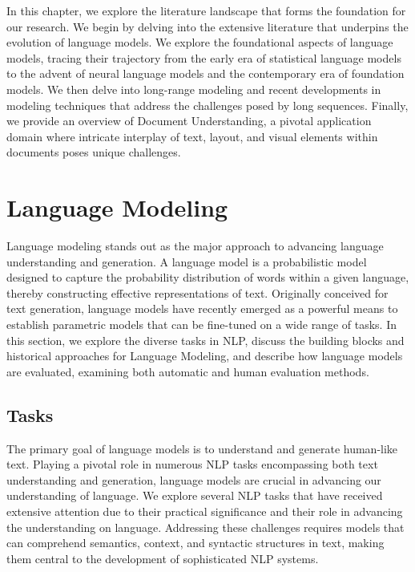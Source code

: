 
In this chapter, we explore the literature landscape that forms the foundation for our research. We begin by delving into the extensive literature that underpins the evolution of language models. We explore the foundational aspects of language models, tracing their trajectory from the early era of statistical language models to the advent of neural language models and the contemporary era of foundation models. We then delve into long-range modeling and recent developments in modeling techniques that address the challenges posed by long sequences. Finally, we provide an overview of Document Understanding, a pivotal application domain where intricate interplay of text, layout, and visual elements within documents poses unique challenges.

\section{Language Modeling}

Language modeling stands out as the major approach to advancing language understanding and generation. A language model is a probabilistic model designed to capture the probability distribution of words within a given language, thereby constructing effective representations of text. Originally conceived for text generation, language models have recently emerged as a powerful means to establish parametric models that can be fine-tuned on a wide range of tasks. 
In this section, we explore the diverse tasks in \ac{NLP}, discuss the building blocks and historical approaches for Language Modeling, and describe how language models are evaluated, examining both automatic and human evaluation methods.

\subsection{Tasks} 

The primary goal of language models is to understand and generate human-like text. Playing a pivotal role in numerous \ac{NLP} tasks encompassing both text understanding and generation, language models are crucial in advancing our understanding of language. We explore several \ac{NLP} tasks that have received extensive attention due to their practical significance and their role in advancing the understanding on language. Addressing these challenges requires models that can comprehend semantics, context, and syntactic structures in text, making them central to the development of sophisticated \ac{NLP} systems.

